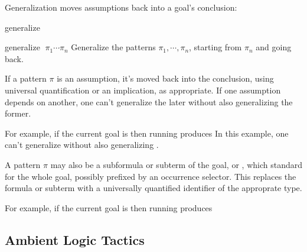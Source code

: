Generalization moves assumptions back into a goal's conclusion:

\begin{tactic}{generalize}
  \begin{tsyntax}[empty]{generalize $\;\pi_1 \cdots \pi_n$}
    Generalize the patterns $\pi_1, \cdots, \pi_n$, starting from
    $\pi_n$ and going back.

    If a pattern $\pi$ is an assumption, it's moved back into the
    conclusion, using universal quantification or an implication,
    as appropriate. If one assumption depends on another, one can't
    generalize the later without also generalizing the former.

    For example, if the current goal is
    then running
    produces
    In this example, one can't generalize  without also
    generalizing .

    A pattern $\pi$ may also be a subformula or subterm of the goal,
    or \ec{_}, which standard for the whole goal, possibly prefixed by
    an occurrence selector. This replaces the formula or subterm
    with a universally quantified identifier of the approprate type.

    For example, if the current goal is
    then running
    produces
  \end{tsyntax}
\end{tactic}

\subsection{Ambient Logic Tactics}






















